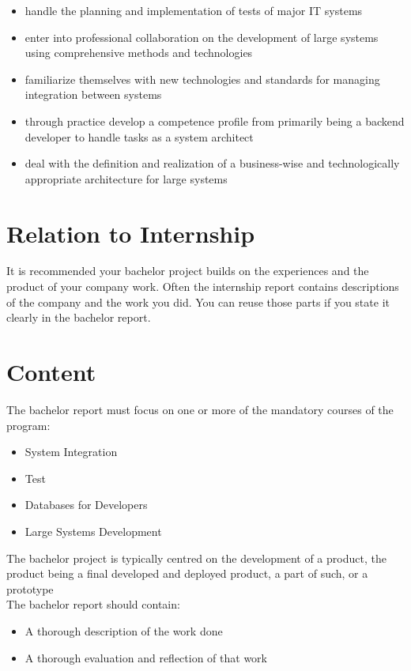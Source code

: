 \documentclass[12pt]{article}
\begin{document}
\begin{itemize}
    \item handle the planning and implementation of tests of major IT systems
    \item enter into professional collaboration on the development of large systems using comprehensive methods and technologies
    \item familiarize themselves with new technologies and standards for managing integration between systems
    \item through practice develop a competence profile from primarily being a backend developer to handle tasks as a system architect
    \item deal with the definition and realization of a business-wise and technologically appropriate architecture for large systems
\end{itemize}

\section{Relation to Internship}
It is recommended your bachelor project builds
on the experiences and the product of your
company work.
Often the internship report contains descriptions
of the company and the work you did. You can
reuse those parts if you state it clearly in the
bachelor report. 

\section{Content}
The bachelor report must focus on one or more of
the mandatory courses of the program:
\begin{itemize}
\item System Integration
\item Test
\item Databases for Developers
\item Large Systems Development\\
\end{itemize}

\noindent The bachelor project is typically centred on the
development of a product, the product being a
final developed and deployed product, a part of
such, or a prototype\\

\noindent The bachelor report should contain:
\begin{itemize}
\item A thorough description of the work done
\item A thorough evaluation and reflection of that work
\end{itemize}



\end{document}
